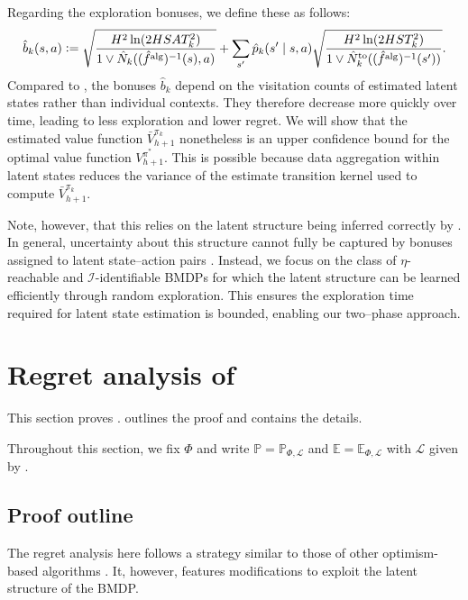 \documentclass[11pt]{article}
\newcommand{\eqdef}{\vcentcolon=}
\newcommand{\mcI}{\mathcal{I}}
\newcommand{\mcL}{\mathcal{L}}
\newcommand{\mbbP}{\mathbb{P}}
\newcommand{\mbbE}{\mathbb{E}}
\newcommand{\alg}{\textnormal{alg}}
\theoremstyle{definition}
\theoremstyle{definition}
\begin{document}
Regarding the exploration bonuses, we define these as follows:
\begin{equation}
	\label{eqn:bonus_def}
	\hat{b}_k(s,a)
	\eqdef
	\sqrt{\frac{H^2\ln(2HSAT_k^2)}{1\vee \hat{N}_k((\hat{f}^{\alg})^{-1}(s),a)}}
	+
	\sum_{s'}\hat{p}_k(s'\mid s,a)\sqrt{\frac{H^2\ln(2HST_k^2)}{1\vee \hat{N}_k^{\mathrm{to}}((\hat{f}^{\alg})^{-1}(s'))}}
	.
\end{equation}
Compared to \cite{UCRLVI}, the bonuses $\hat{b}_k$ depend on the visitation counts of estimated latent states rather than individual contexts.
They therefore decrease more quickly over time, leading to less exploration and lower regret.
We will show that the estimated value function $\bar{V}^{\pi_k}_{h+1}$ nonetheless is an upper confidence bound for the optimal value function $V^{\pi^*}_{h+1}$.
This is possible because data aggregation within latent states reduces the variance of the estimate transition kernel used to compute $\bar{V}^{\pi_k}_{h+1}$.

Note, however, that this relies on the latent structure being inferred correctly by .
In general, uncertainty about this structure cannot fully be captured by bonuses assigned to latent state--action pairs \cite{DBLP:journals/corr/abs-2110-04652}.
Instead, we focus on the class of $\eta$-reachable and $\mcI$-identifiable \glspl{BMDP} for which the latent structure can be learned efficiently through random exploration.
This ensures the exploration time required for latent state estimation is bounded, enabling our two--phase approach.

\section{Regret analysis of \texorpdfstring{}{the algorithm}}
\label{sec:regret_analysis}

This section proves .
 outlines the proof and  contains the details.

Throughout this section, we fix $\Phi$ and write $\mbbP=\mbbP_{\Phi,\mcL}$ and $\mbbE=\mbbE_{\Phi,\mcL}$ with $\mcL$ given by .

\subsection{Proof outline}
\label{sec:proof_outline}


The regret analysis here follows a strategy similar to those of other optimism-based algorithms \cite{10.1145/1102351.1102459, szita2010model, munos2014bandits, UCRLVI}.
It, however, features modifications to exploit the latent structure of the \gls{BMDP}.
\end{document}
